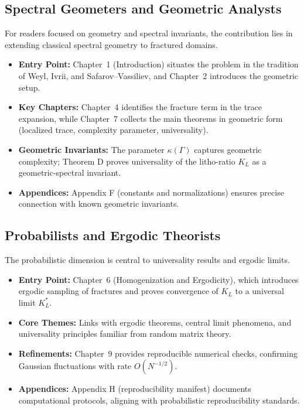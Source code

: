 \subsection*{Spectral Geometers and Geometric Analysts}

For readers focused on geometry and spectral invariants, the
contribution lies in extending classical spectral geometry to fractured
domains.

\begin{itemize}
  \item \textbf{Entry Point:} Chapter~1 (Introduction) situates the
  problem in the tradition of Weyl, Ivrii, and Safarov–Vassiliev, and
  Chapter~2 introduces the geometric setup.

  \item \textbf{Key Chapters:} Chapter~4 identifies the fracture term in
  the trace expansion, while Chapter~7 collects the main theorems in
  geometric form (localized trace, complexity parameter, universality).

  \item \textbf{Geometric Invariants:} The parameter $\kappa(\Gamma)$
  captures geometric complexity; Theorem D proves universality of the
  litho-ratio $K_L$ as a geometric-spectral invariant.

  \item \textbf{Appendices:} Appendix F (constants and normalizations)
  ensures precise connection with known geometric invariants.
\end{itemize}

\subsection*{Probabilists and Ergodic Theorists}

The probabilistic dimension is central to universality results and
ergodic limits.

\begin{itemize}
  \item \textbf{Entry Point:} Chapter~6 (Homogenization and Ergodicity),
  which introduces ergodic sampling of fractures and proves convergence
  of $K_L$ to a universal limit $K_L^*$.

  \item \textbf{Core Themes:} Links with ergodic theorems, central limit
  phenomena, and universality principles familiar from random matrix
  theory.

  \item \textbf{Refinements:} Chapter~9 provides reproducible numerical
  checks, confirming Gaussian fluctuations with rate $O(N^{-1/2})$.

  \item \textbf{Appendices:} Appendix H (reproducibility manifest)
  documents computational protocols, aligning with probabilistic
  reproducibility standards.
\end{itemize}


